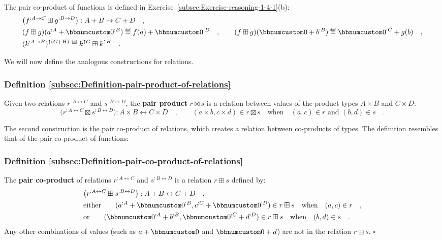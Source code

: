 The pair co-product of functions
is defined in Exercise~\ref{subsec:Exercise-reasoning-1-4-1}(b):
\begin{align*}
 & \big(f^{:A\rightarrow C}\boxplus g^{:B\rightarrow D}\big):A+B\rightarrow C+D\quad,\\
 & (f\boxplus g)(a^{:A}+\bbnum 0^{:B})\triangleq f(a)+\bbnum 0^{:D}\quad,\quad\quad(f\boxplus g)(\bbnum 0+b^{:B})\triangleq\bbnum 0^{:C}+g(b)\quad,\\
 & (k^{:A\rightarrow B})^{\uparrow(G+H)}\triangleq k^{\uparrow G}\boxplus k^{\uparrow H}\quad.
\end{align*}

We will now define the analogous constructions for relations.

\subsubsection{Definition \label{subsec:Definition-pair-product-of-relations}\ref{subsec:Definition-pair-product-of-relations}}

Given two relations $r^{:A\leftrightarrow C}$ and $s^{:B\leftrightarrow D}$,
the \textbf{pair product}  $r\boxtimes s$
is a relation between values of the product types $A\times B$ and
$C\times D$:
\[
\big(r^{:A\leftrightarrow C}\boxtimes s^{:B\leftrightarrow D}\big):A\times B\leftrightarrow C\times D\quad,\quad\quad(a\times b,c\times d)\in r\boxtimes s\quad\text{when}\quad(a,c)\in r\text{ and }(b,d)\in s\quad.
\]

The second construction is the pair co-product of relations,
which creates a relation between co-products of types. The definition
resembles that of the pair co-product
of functions:

\subsubsection{Definition \label{subsec:Definition-pair-co-product-of-relations}\ref{subsec:Definition-pair-co-product-of-relations}}

The \textbf{pair co-product} of relations $r^{:A\leftrightarrow C}$
and $s^{:B\leftrightarrow D}$ is a relation $r\boxplus s$ defined
by:
\begin{align*}
 & \big(r^{:A\leftrightarrow C}\boxplus s^{:B\leftrightarrow D}\big):A+B\leftrightarrow C+D\quad,\\
 & \text{either}\quad\quad(a^{:A}+\bbnum 0^{:B},c^{:C}+\bbnum 0^{:D})\in r\boxplus s\quad\text{when}\quad(a,c)\in r\quad,\\
 & \text{or}\quad\quad(\bbnum 0^{:A}+b^{:B},\bbnum 0^{:C}+d^{:D})\in r\boxplus s\quad\text{when}\quad(b,d)\in s\quad.
\end{align*}
Any other combinations of values (such as $a+\bbnum 0$ and $\bbnum 0+d$)
are not in the relation $r\boxplus s$. $\square$

